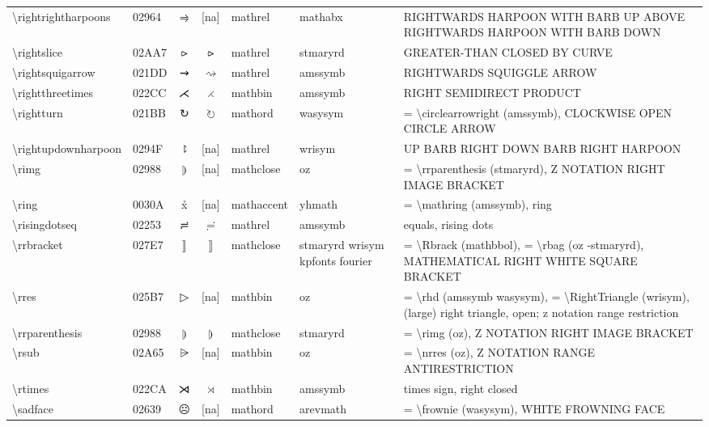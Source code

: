 \documentclass[a4paper,landscape]{article}
\begin{document}
\begin{longtable}{llcclll}
\textbackslash{}rightrightharpoons & 02964 & ⥤ & [na] & mathrel & mathabx & RIGHTWARDS HARPOON WITH BARB UP ABOVE RIGHTWARDS HARPOON WITH BARB DOWN \\
\textbackslash{}rightslice & 02AA7 & ⪧ & $\rightslice$ & mathrel & stmaryrd & GREATER-THAN CLOSED BY CURVE \\
\textbackslash{}rightsquigarrow & 021DD & ⇝ & $\rightsquigarrow$ & mathrel & amssymb & RIGHTWARDS SQUIGGLE ARROW \\
\textbackslash{}rightthreetimes & 022CC & ⋌ & $\rightthreetimes$ & mathbin & amssymb & RIGHT SEMIDIRECT PRODUCT \\
\textbackslash{}rightturn & 021BB & ↻ & $\rightturn$ & mathord & wasysym & = \textbackslash{}circlearrowright (amssymb),  CLOCKWISE OPEN CIRCLE ARROW \\
\textbackslash{}rightupdownharpoon & 0294F & ⥏ & [na] & mathrel & wrisym & UP BARB RIGHT DOWN BARB RIGHT HARPOON \\
\textbackslash{}rimg & 02988 & ⦈ & [na] & mathclose & oz & = \textbackslash{}rrparenthesis (stmaryrd), Z NOTATION RIGHT IMAGE BRACKET \\
\textbackslash{}ring & 0030A & x̊ & [na] & mathaccent & yhmath & = \textbackslash{}mathring (amssymb),  ring \\
\textbackslash{}risingdotseq & 02253 & ≓ & $\risingdotseq$ & mathrel & amssymb & equals, rising dots \\
\textbackslash{}rrbracket & 027E7 & ⟧ & $\rrbracket$ & mathclose & stmaryrd wrisym kpfonts fourier & = \textbackslash{}Rbrack (mathbbol), = \textbackslash{}rbag (oz -stmaryrd), MATHEMATICAL RIGHT WHITE SQUARE BRACKET \\
\textbackslash{}rres & 025B7 & ▷ & [na] & mathbin & oz & = \textbackslash{}rhd (amssymb wasysym),  = \textbackslash{}RightTriangle (wrisym),  (large) right triangle,  open; z notation range restriction \\
\textbackslash{}rrparenthesis & 02988 & ⦈ & $\rrparenthesis$ & mathclose & stmaryrd & = \textbackslash{}rimg (oz),  Z NOTATION RIGHT IMAGE BRACKET \\
\textbackslash{}rsub & 02A65 & ⩥ & [na] & mathbin & oz & = \textbackslash{}nrres (oz), Z NOTATION RANGE ANTIRESTRICTION \\
\textbackslash{}rtimes & 022CA & ⋊ & $\rtimes$ & mathbin & amssymb & times sign, right closed \\
\textbackslash{}sadface & 02639 & ☹ & [na] & mathord & arevmath & = \textbackslash{}frownie (wasysym),  WHITE FROWNING FACE \\

\end{longtable}
\end{document}

